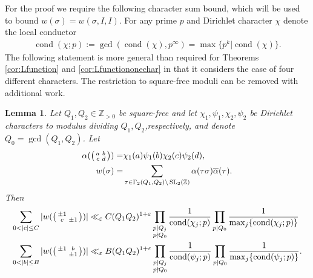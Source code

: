 \documentclass[12pt]{amsart}
\newtheorem{lemma}[theorem]{Lemma}
\theoremstyle{definition}
\theoremstyle{remark}
\numberwithin{equation}{section}
\newcommand{\cond}{\operatorname{cond}}
\newcommand{\Z}{{\mathbb Z}}
\newcommand{\1}{{\mathbf 1}}
\newcommand{\eps}{\varepsilon}
\newcommand{\SL}{\operatorname{SL}_2}
\begin{document}
For the proof we require the following character sum bound, which will be used to bound $w(\sigma)=w(\sigma,I,I)$.  For any prime $p$ and Dirichlet character $\chi$ denote the local conductor
\begin{align*}
    \cond(\chi;p) := \gcd(\cond(\chi),p^\infty) = \max\{p^k | \cond(\chi)\}.
\end{align*}
The following statement is more general than required for Theorems  \ref{cor:Lfunction} and \ref{cor:Lfunctiononechar} in that it considers the case of four different characters. The restriction to square-free moduli can be removed with additional work.
\begin{lemma} \label{le:charactersumbound}
 Let $Q_1,Q_2 \in \Z_{>0}$ be square-free and  let $\chi_1,\psi_1,\chi_2,\psi_2$ be Dirichlet characters to modulus dividing $Q_1,Q_2$,respectively, and denote $Q_0=\gcd(Q_1,Q_2)$. Let
    \begin{align*}
    \alpha(\smqty(a &b \\ c &d)) =& \chi_1(a) \psi_1(b) \chi_2(c) \psi_2(d), \\
    w(\sigma) = & \sum_{\tau \in \Gamma_2(Q_1,Q_2) \backslash \SL(\Z)} \alpha(\tau \sigma) \overline{\alpha}(\tau).
    \end{align*}
    Then
    \begin{align*}
         \sum_{0<  |c| \leq C} |w(\smqty(\pm 1 &  \\ c & \pm 1))| &  \ll_\eps C(Q_1Q_2)^{1+\eps}  \prod_{\substack{p| Q_j \\ p \nmid Q_0}} \frac{1}{\cond(\chi_j;p)}  \prod_{\substack{ p \mid Q_0}} \frac{1}{\max_j \{\cond(\chi_j;p)\}}   \\
   \sum_{0<|b| \leq  B} |w(\smqty(\pm 1 & b \\  & \pm 1))| & \ll_\eps B  (Q_1Q_2)^{1+\eps}  \prod_{\substack{p| Q_j \\ p \nmid Q_0}} \frac{1}{\cond(\psi_j;p)}  \prod_{\substack{ p \mid Q_0}} \frac{1}{\max_j \{\cond(\psi_j;p)\}}.
    \end{align*}
\end{lemma}
\end{document}

